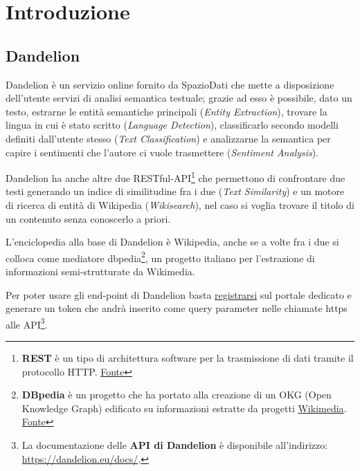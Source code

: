 
\chapter{Introduzione}
\section{Dandelion}

Dandelion è un servizio online fornito da SpazioDati che mette a disposizione dell'utente servizi di analisi semantica testuale; 
grazie ad esso è possibile, dato un testo, estrarne le entità semantiche principali (\textit{Entity Extraction}), trovare la lingua in cui è stato 
scritto (\textit{Language Detection}), classificarlo secondo modelli definiti dall'utente stesso (\textit{Text Classification}) e analizzarne la semantica 
per capire i sentimenti che l'autore ci vuole trasmettere (\textit{Sentiment Analysis}). 

Dandelion ha anche altre due RESTful-API\footnote{
    \textbf{REST} è un tipo di architettura software per la trasmissione di dati tramite il protocollo HTTP. \href{https://it.wikipedia.org/wiki/Representational_State_Transfer
    }{Fonte} 
} che permettono di confrontare due testi generando un indice di similitudine fra i due (\textit{Text Similarity}) e
un motore di ricerca di entità di Wikipedia (\textit{Wikisearch}), nel caso si voglia trovare il titolo di un contenuto senza conoscerlo a priori.

L'enciclopedia alla base di Dandelion è Wikipedia, anche se a volte fra i due si colloca come mediatore dbpedia\footnote{
    \textbf{DBpedia} è un progetto che ha portato alla creazione di un OKG (Open Knowledge Graph) edificato su informazioni estratte da progetti \href{https://www.wikimedia.org/}{Wikimedia}. \href{https://wiki.dbpedia.org/about}{Fonte}   
}, un progetto italiano per l'estrazione di 
informazioni semi-strutturate da Wikimedia. 

Per poter usare gli end-point di Dandelion basta \href{https://dandelion.eu/accounts/register/}{registrarsi} sul portale dedicato e generare un token che andrà inserito come query parameter nelle chiamate https alle API\footnote{
    La documentazione delle \textbf{API di Dandelion} è disponibile all'indirizzo: \href{https://dandelion.eu/docs/}{https://dandelion.eu/docs/}.
}.

